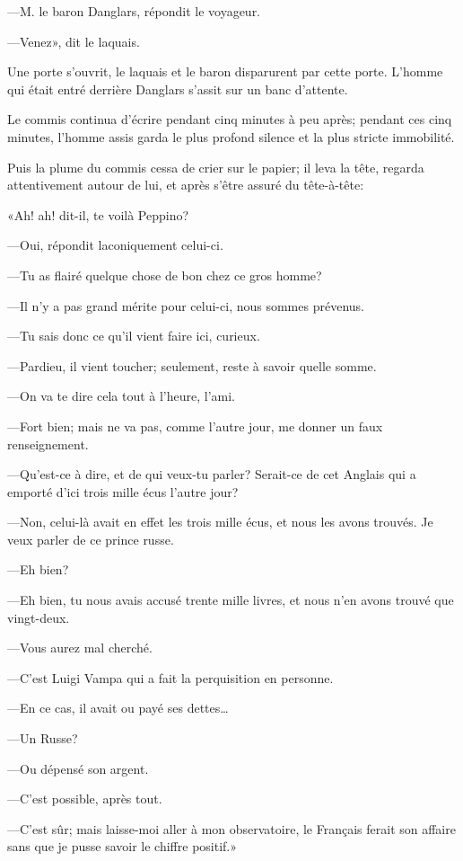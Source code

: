 —M. le baron Danglars, répondit le voyageur. 

—Venez», dit le laquais. 

Une porte s'ouvrit, le laquais et le baron disparurent par cette porte. L'homme qui était entré derrière Danglars s'assit sur un banc d'attente. 

Le commis continua d'écrire pendant cinq minutes à peu après; pendant ces cinq minutes, l'homme assis garda le plus profond silence et la plus stricte immobilité. 

Puis la plume du commis cessa de crier sur le papier; il leva la tête, regarda attentivement autour de lui, et après s'être assuré du tête-à-tête: 

«Ah! ah! dit-il, te voilà Peppino? 

—Oui, répondit laconiquement celui-ci. 

—Tu as flairé quelque chose de bon chez ce gros homme? 

—Il n'y a pas grand mérite pour celui-ci, nous sommes prévenus. 

—Tu sais donc ce qu'il vient faire ici, curieux. 

—Pardieu, il vient toucher; seulement, reste à savoir quelle somme. 

—On va te dire cela tout à l'heure, l'ami. 

—Fort bien; mais ne va pas, comme l'autre jour, me donner un faux renseignement. 

—Qu'est-ce à dire, et de qui veux-tu parler? Serait-ce de cet Anglais qui a emporté d'ici trois mille écus l'autre jour? 

—Non, celui-là avait en effet les trois mille écus, et nous les avons trouvés. Je veux parler de ce prince russe. 

—Eh bien? 

—Eh bien, tu nous avais accusé trente mille livres, et nous n'en avons trouvé que vingt-deux. 

—Vous aurez mal cherché. 

—C'est Luigi Vampa qui a fait la perquisition en personne. 

—En ce cas, il avait ou payé ses dettes\dots 

—Un Russe? 

—Ou dépensé son argent. 

—C'est possible, après tout. 

—C'est sûr; mais laisse-moi aller à mon observatoire, le Français ferait son affaire sans que je pusse savoir le chiffre positif.» 

